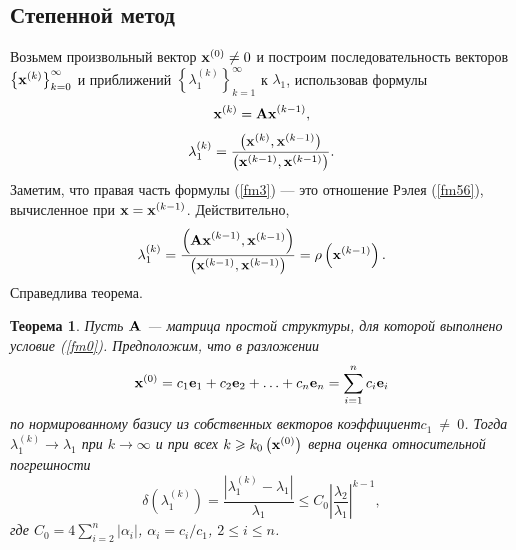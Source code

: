 \documentclass[12pt]{article}
\newtheorem{theorem}{Теорема}
\begin{document}
	\subsection*{Степенной метод}
	
	Возьмем произвольный вектор $\bold{x}^{\left(0\right)}\neq 0$ и построим последовательность векторов $\left\{\bold{x}^{\left(k\right)}\right\}^{\infty}_{k=0}$ и приближений $\left\{\lambda_1^{\left(k\right)}\right\}_{k=1}^{\infty}$ к $\lambda_1$, использовав формулы
	\begin{equation}
		\bold{x}^{\left(k\right)}=\bold{Ax}^{\left(k-1\right)},\label{fm2}
	\end{equation}
	\begin{equation}
		\lambda_1^{\left(k\right)}=\frac{\left(\bold{x}^{\left(k\right)},\bold{x}^{\left(k-1\right)}\right)}{\left(\bold{x}^{\left(k-1\right)},\bold{x}^{\left(k-1\right)}\right)}.\label{fm3}
	\end{equation}
	Заметим, что правая часть формулы (\ref{fm3}) --- это отношение Рэлея (\ref{fm56}), вычисленное при $\bold{x}=\bold{x}^{\left(k-1\right)}$. Действительно,
	\begin{equation}
		\lambda_1^{\left(k\right)}=\frac{\left(\bold{Ax}^{\left(k-1\right)},\bold{x}^{\left(k-1\right)}\right)}{\left(\bold{x}^{\left(k-1\right)},\bold{x}^{\left(k-1\right)}\right)}=\rho\left(\bold{x}^{\left(k-1\right)}\right).
	\end{equation}
	Справедлива теорема.
	\begin{theorem}\label{th7}
		Пусть $\bold{A}$ --- матрица простой структуры, для которой выполнено условие (\ref{fm0}). Предположим, что в разложении
		\begin{equation}
			\bold{x}^{\left(0\right)}=c_1\bold{e}_1+c_2\bold{e}_2+\ldots+c_n\bold{e}_n=\sum_{i=1}^{n}c_i\bold{e}_i\label{fm5}
		\end{equation}
		по нормированному базису из собственных векторов коэффициент\linebreak $c_1~\neq~0$. Тогда $\lambda_1^{\left(k\right)}\rightarrow \lambda_1$ при $k\rightarrow\infty$ и при всех $k\geqslant k_0\left(\bold{x}^{\left(0\right)}\right)$ верна оценка относительной погрешности
		\begin{equation}
			\delta\left(\lambda_1^{\left(k\right)}\right)=\frac{\left|\lambda_1^{\left(k\right)}-\lambda_1\right|}{\lambda_1}\leqslant C_0\left|\frac{\lambda_2}{\lambda_1}\right|^{k-1},\label{fm6}
		\end{equation}
		где $C_0=4\sum_{i=2}^{n}\left|\alpha_i\right|$, $\alpha_i=c_i/c_1$, $2\leqslant i \leqslant n$.
	\end{theorem}
\end{document}
